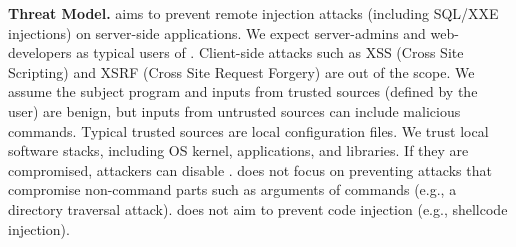 \noindent
{\bf Threat Model.}
\sysname aims to prevent remote  injection attacks (including SQL/XXE injections) on server-side applications. 
We expect server-admins and web-developers as typical users of \sysname.
Client-side attacks such as XSS (Cross Site Scripting) and XSRF (Cross Site Request Forgery) are out of the scope.
%
We assume the subject program and inputs from trusted sources (defined by the user) are benign, but inputs from untrusted sources can include malicious commands. Typical trusted sources are local configuration files. 
We trust local software stacks, including OS kernel, applications, and libraries. If they are compromised, attackers can disable \sysname.
%
\sysname does not focus on preventing attacks that compromise non-command parts such as arguments of commands (e.g., a directory traversal attack).
\sysname does not aim to prevent  code injection (e.g., shellcode injection). 
